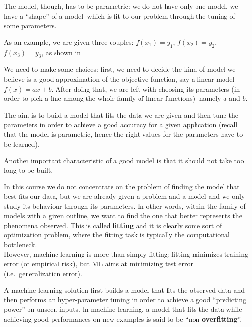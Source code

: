 \documentclass[computationalMathematics.tex]{subfiles}
\begin{document}
The model, though, has to be parametric: we do not have only one model, we have a ``shape'' of a model, which is fit to our problem through the tuning of some parameters.

\begin{example}
  As an example, we are given three couples: $f(x_1) = y_1$, $f(x_2) = y_2$, $f(x_3) = y_3$, as shown in .


We need to make some choices: first, we need to decide the kind of model we believe is a good approximation of the objective function, say a linear model $f(x) = ax + b$.
  After doing that, we are left with choosing its parameters (in order to pick a line among the whole family of linear functions), namely $a$ and $b$.
\end{example}

The aim is to build a model that fits the data we are given and then tune the parameters in order to achieve a good accuracy for a given application (recall that the model is parametric, hence the right values for the parameters have to be learned).

Another important characteristic of a good model is that it should not take too long to be built.

In this course we do not concentrate on the problem of finding the model that best fits our data, but we are already given a problem and a model and we only study its behaviour through its parameters.
In other words, within the family of models with a given outline, we want to find the one that better represents the phenomena observed.
This is called \textbf{fitting} and it is clearly some sort of optimization problem, where the fitting task is typically the computational bottleneck.\\
However, machine learning is more than simply fitting: fitting minimizes training error (or empirical risk), but ML aims at minimizing test error (i.e.~generalization error).

A machine learning solution first builds a model that fits the observed data and then performs an hyper-parameter tuning in order to achieve a good ``predicting power'' on unseen inputs.
In machine learning, a model that fits the data while achieving good performances on new examples is said to be ``non \textbf{overfitting}''.
\end{document}

